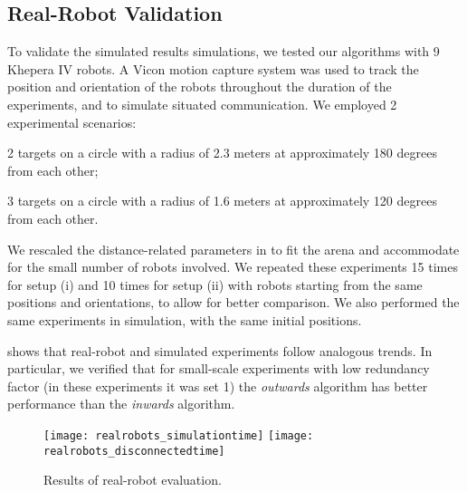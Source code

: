 








\subsection{Real-Robot Validation}
To validate the simulated results simulations, we tested our
algorithms with 9 Khepera IV robots. A Vicon motion capture system was
used to track the position and orientation of the robots throughout the
duration of the experiments, and to simulate situated communication.
We employed 2 experimental scenarios:
\begin{inparaenum}[(i)]
\item 2 targets on a circle with a radius of 2.3 meters at
  approximately 180 degrees from each other;
\item 3 targets on a circle with a radius of 1.6 meters at
  approximately 120 degrees from each other.
\end{inparaenum}
We rescaled the distance-related parameters in  to fit
the arena and accommodate for the small number of robots involved.  We
repeated these experiments 15 times for setup (i) and 10 times for
setup (ii) with robots starting from the same positions and
orientations, to allow for better comparison. We also performed the
same experiments in simulation, with the same initial positions.

 shows that real-robot and simulated experiments
follow analogous trends. In particular, we verified that for
small-scale experiments with low redundancy factor (in these
experiments it was set 1) the \emph{outwards} algorithm has better
performance than the \emph{inwards} algorithm.
\begin{figure}
    \centering
    \texttt{[image: realrobots\_simulationtime]}
    \texttt{[image: realrobots\_disconnectedtime]}
    \caption{Results of real-robot evaluation.}
    \label{fig:realexperiment}
\end{figure}

